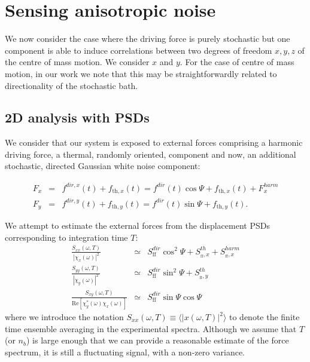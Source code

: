 \documentclass[twocolumn,english,notitlepage,superscriptaddress,nofootinbib]{revtex4-2}
\begin{document}
 \section{Sensing anisotropic noise}

 We now consider the case where the driving force is purely stochastic but one component is able to induce correlations between two degrees of freedom $x,y,z$ of the centre of mass motion.  We consider $x$ and $y$.
For the case of centre of mass motion,  in our work we note that this may be straightforwardly related to directionality of the stochastic bath.
 \subsection{2D analysis with PSDs}

We consider that our system is exposed to external forces comprising a harmonic driving force,  a thermal, randomly oriented,  component and now,  an additional  stochastic,  directed
Gaussian white noise component:

 \begin{eqnarray} \label{Fdir}
 F_x &=& f^{dir,x}(t)+ f_{\text{th},x}(t)=f^{dir}(t) \cos \Psi + f_{\text{th},x}(t) + F_x^{harm}\nonumber \\
 F_y & = & f^{dir,y}(t)+ f_{\text{th},y}(t)=f^{dir}(t) \sin \Psi +  f_{\text{th},y}(t).
 \end{eqnarray}

We attempt to estimate the external forces from the displacement PSDs corresponding to integration time $T$:
\begin{eqnarray}
 \frac{S_{xx}(\omega,T)} {|\chi_x(\omega)|^2}  &\simeq &  S^{dir}_{\text{ff}} \cos^2 \Psi  + S^{th}_{_{\text{ff}},x} + S^{harm}_{_{\text{ff}},x}\nonumber  \\
  \frac{S_{yy}(\omega,T)} {|\chi_y(\omega)|^2}  &\simeq&  S^{dir}_{\text{ff}} \sin^2 \Psi + S^{th}_{_{\text{ff}},y} \nonumber \\
    \frac{S_{xy}(\omega,T)} {\text{Re}[\chi_y^*(\omega)\chi_x(\omega)] } &\simeq &  S^{dir}_{\text{ff}} \sin \Psi \cos \Psi
    \label{PSDxy}
 \end{eqnarray}
where we introduce  the notation $S_{xx}(\omega,T) \equiv  \langle |x(\omega,T)|^2\rangle$ to denote the finite time ensemble averaging
in the experimental spectra. Although  we assume that $T$ (or $n_b$) is large enough that we can  provide a reasonable estimate of the force spectrum, it is still a fluctuating signal, with a non-zero variance.
\end{document}
